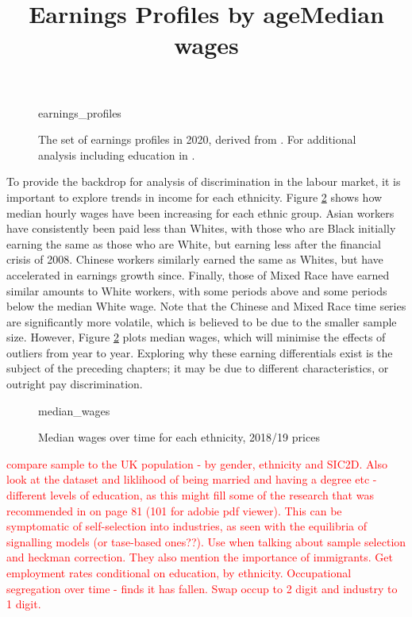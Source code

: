 \documentclass[class=article, crop=false]{standalone}
\begin{document}
\begin{figure}[h]
\centering
    \title{Earnings Profiles by age}
    {earnings_profiles}
    \caption{The set of earnings profiles in 2020, derived from \citep{ONSc}. For additional analysis including education in \citep{Mincer}.}
    \label{fig:earnings_profiles}
\end{figure}

To provide the backdrop for analysis of discrimination in the labour market, it is important to explore trends in income for each ethnicity. Figure \ref{fig:median_wages} shows how median hourly wages have been increasing for each ethnic group. Asian workers have consistently been paid less than Whites, with those who are Black initially earning the same as those who are White, but earning less after the financial crisis of 2008. Chinese workers similarly earned the same as Whites, but have accelerated in earnings growth since. Finally, those of Mixed Race have earned similar amounts to White workers, with some periods above and some periods below the median White wage. Note that the Chinese and Mixed Race time series are significantly more volatile, which is believed to be due to the smaller sample size. However, Figure \ref{fig:median_wages} plots median wages, which will minimise the effects of outliers from year to year. Exploring why these earning differentials exist is the subject of the preceding chapters; it may be due to different characteristics, or outright pay discrimination.

\begin{figure}[]
\centering
    \title{Median wages}
    {median_wages}
    \caption{Median wages over time for each ethnicity, 2018/19 prices}
    \label{fig:median_wages}
\end{figure}

\textcolor{red}{compare sample to the UK population - by gender, ethnicity and SIC2D. Also look at the dataset and liklihood of being married and having a degree etc - different levels of education, as this might fill some of the research that was recommended in \citep{Longhi2} on page 81 (101 for adobie pdf viewer).
This can be symptomatic of self-selection into industries, as seen with the equilibria of signalling models (or tase-based ones??).
Use \citep{Shields} when talking about sample selection and heckman correction. They also mention the importance of immigrants.
Get employment rates conditional on education, by ethnicity.
Occupational segregation over time - \citep{Longhi3} finds it has fallen.
Swap occup to 2 digit and industry to 1 digit.}
\end{document}
